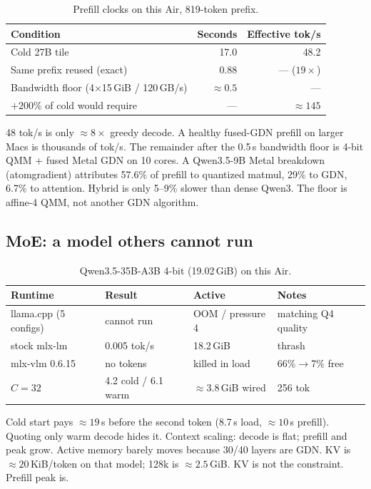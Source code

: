 \begin{table}[t]
\centering
\caption{Prefill clocks on this Air, 819-token prefix.}
\label{tab:prefill}
\begin{tabular}{@{}lrr@{}}
\toprule
Condition & Seconds & Effective tok/s \\
\midrule
Cold 27B tile & 17.0 & 48.2 \\
Same prefix reused (exact) & 0.88 & --- ($19\times$) \\
Bandwidth floor (4$\times$15\,GiB / 120\,GB/s) & $\approx 0.5$ & --- \\
${+}200\%$ of cold would require & --- & $\approx 145$ \\
\bottomrule
\end{tabular}
\end{table}

48 tok/s is only $\approx 8\times$ greedy decode. A healthy fused-GDN prefill on larger Macs is thousands of tok/s. The remainder after the 0.5\,s bandwidth floor is 4-bit QMM + fused Metal GDN on 10 cores. A Qwen3.5-9B Metal breakdown (atomgradient) attributes 57.6\% of prefill to quantized matmul, 29\% to GDN, 6.7\% to attention. Hybrid is only 5--9\% slower than dense Qwen3. The floor is affine-4 QMM, not another GDN algorithm.

\subsection{MoE: a model others cannot run}

\begin{table}[t]
\centering
\caption{Qwen3.5-35B-A3B 4-bit (19.02\,GiB) on this Air.}
\label{tab:moe}
\begin{tabular}{@{}llll@{}}
\toprule
Runtime & Result & Active & Notes \\
\midrule
llama.cpp (5 configs) & cannot run & OOM / pressure 4 & matching Q4 quality \\
stock mlx-lm & 0.005 tok/s & 18.2\,GiB & thrash \\
mlx-vlm 0.6.15 & no tokens & killed in load & 66\%$\to$7\% free \\
\slotbank{} $C{=}32$ & 4.2 cold / 6.1 warm & $\approx 3.8$\,GiB wired & 256 tok \\
\bottomrule
\end{tabular}
\end{table}

Cold start pays $\approx 19$\,s before the second token (8.7\,s load, $\approx 10$\,s prefill). Quoting only warm decode hides it. Context scaling: decode is flat; prefill and peak grow. Active memory barely moves because 30/40 layers are GDN. KV is $\approx 20$\,KiB/token on that model; 128k is $\approx 2.5$\,GiB. KV is not the constraint. Prefill peak is.

